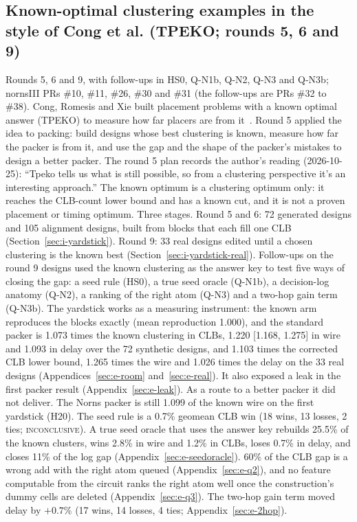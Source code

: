 \subsection{Known-optimal clustering examples in the style of Cong et al. (TPEKO; rounds 5, 6 and 9)}
\label{sec:e-tpeko}

 Rounds 5, 6 and 9, with follow-ups in HS0, Q-N1b, Q-N2, Q-N3 and Q-N3b; nornsIII PRs \#10, \#11, \#26, \#30 and \#31 (the follow-ups are PRs \#32 to \#38).
 Cong, Romesis and Xie built placement problems with a known optimal answer (TPEKO) to measure how far placers are from it~\cite{Cong03tpeko}. Round 5 applied the idea to packing: build designs whose best clustering is known, measure how far the packer is from it, and use the gap and the shape of the packer's mistakes to design a better packer. The round 5 plan records the author's reading (2026-10-25): ``Tpeko tells us what is still possible, so from a clustering perspective it's an interesting approach.'' The known optimum is a clustering optimum only: it reaches the CLB-count lower bound and has a known cut, and it is not a proven placement or timing optimum.
 Three stages. Round 5 and 6: 72 generated designs and 105 alignment designs, built from blocks that each fill one CLB (Section~\ref{sec:i-yardstick}). Round 9: 33 real designs edited until a chosen clustering is the known best (Section~\ref{sec:i-yardstick-real}). Follow-ups on the round 9 designs used the known clustering as the answer key to test five ways of closing the gap: a seed rule (HS0), a true seed oracle (Q-N1b), a decision-log anatomy (Q-N2), a ranking of the right atom (Q-N3) and a two-hop gain term (Q-N3b).
 The yardstick works as a measuring instrument: the known arm reproduces the blocks exactly (mean reproduction 1.000), and the standard packer is 1.073 times the known clustering in CLBs, 1.220 [1.168, 1.275] in wire and 1.093 in delay over the 72 synthetic designs, and 1.103 times the corrected CLB lower bound, 1.265 times the wire and 1.026 times the delay on the 33 real designs (Appendices~\ref{sec:e-room} and~\ref{sec:e-real}). It also exposed a leak in the first packer result (Appendix~\ref{sec:e-leak}). As a route to a better packer it did not deliver. The Norns packer is still 1.099 of the known wire on the first yardstick (H20). The seed rule is a 0.7\% geomean CLB win (18 wins, 13 losses, 2 ties; \textsc{inconclusive}). A true seed oracle that uses the answer key rebuilds 25.5\% of the known clusters, wins 2.8\% in wire and 1.2\% in CLBs, loses 0.7\% in delay, and closes 11\% of the log gap (Appendix~\ref{sec:e-seedoracle}). 60\% of the CLB gap is a wrong add with the right atom queued (Appendix~\ref{sec:e-q2}), and no feature computable from the circuit ranks the right atom well once the construction's dummy cells are deleted (Appendix~\ref{sec:e-q3}). The two-hop gain term moved delay by $+0.7\%$ (17 wins, 14 losses, 4 ties; Appendix~\ref{sec:e-2hop}).
